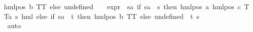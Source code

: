 \begin{isabellebody}
hml{\isacharunderscore}{\kern0pt}pos\ b\ TT\ else\ undefined{\isacharparenright}{\kern0pt}{\isacharparenright}{\kern0pt}\ {\isacharbackquote}{\kern0pt}\ {\isacharbraceleft}{\kern0pt}{\isacharbraceright}{\kern0pt}\ {\isasymunion}\ {\isacharparenleft}{\kern0pt}expr{\isacharunderscore}{\kern0pt}{}\ {\isasymcirc}\ {\isacharparenleft}{\kern0pt}{\isasymlambda}sa{\isachardot}{\kern0pt}\ if\ sa\ {\isacharequal}{\kern0pt}\ s\ then\ hml{\isacharunderscore}{\kern0pt}pos\ a\ {\isacharparenleft}{\kern0pt}hml{\isacharunderscore}{\kern0pt}pos\ c\ {\isacharparenleft}{\kern0pt}TT{\isacharcolon}{\kern0pt}{\isacharcolon}{\kern0pt}{\isacharparenleft}{\kern0pt}{\isacharprime}{\kern0pt}a{\isacharcomma}{\kern0pt}\ {\isacharprime}{\kern0pt}s{\isacharparenright}{\kern0pt}\ hml{\isacharparenright}{\kern0pt}{\isacharparenright}{\kern0pt}\ else\ if\ sa\ {\isacharequal}{\kern0pt}\ t\ then\ hml{\isacharunderscore}{\kern0pt}pos\ b\ TT\ else\ undefined{\isacharparenright}{\kern0pt}{\isacharparenright}{\kern0pt}\ {\isacharbackquote}{\kern0pt}\ {\isacharbraceleft}{\kern0pt}t{\isacharcomma}{\kern0pt}\ s{\isacharbraceright}{\kern0pt}{\isachardoublequoteclose}\isanewline
\ \ \ \ \ \ \ \ \ \ \isamarkupfalse%
\ auto\isanewline
\ \ \ \ \ \ \ \ \isamarkupfalse%

\end{isabellebody}
